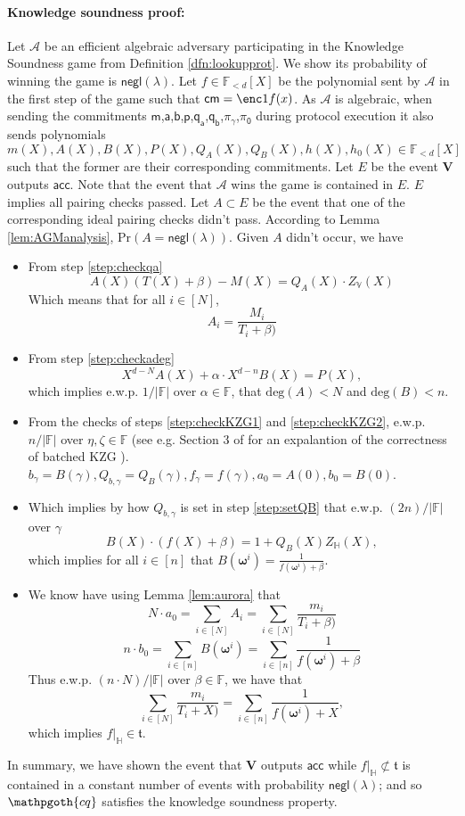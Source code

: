 \documentclass[11pt]{article} %
\newcommand{\cq}{\ensuremath{\mathpgoth{cq} }\xspace}
\newcommand{\F}{\ensuremath{\mathbb F}\xspace}
\newcommand{\adv}{\ensuremath{\mathcal A}\xspace}
\newcommand{\cm}{\ensuremath{\mathsf{cm}}\xspace}
\renewcommand{\deg}{\ensuremath{\mathrm{deg}}\xspace}
\newcommand{\negl}{\ensuremath{\mathsf{negl}(\lambda)}\xspace}
\newcommand{\acc}{\ensuremath{\mathsf{acc}}\xspace}
\newcommand{\ver}{\ensuremath{\mathsf{\mathbf{V}}}\xspace}
\newcommand{\hgen}{\ensuremath{\mathbf{\omega}}\xspace}
\newcommand{\polysofdeg}[1]{\ensuremath{\F_{< #1}[X]}\xspace}
\newcommand{\prob}{\ensuremath{\mathrm{Pr}}\xspace}
\newcommand{\restricttoset}[2]{\ensuremath{#1|_{#2}}\xspace}
\newcommand{\subspace}{\ensuremath{\mathbb{H}}\xspace}
\newcommand{\bigspace}{\ensuremath{\mathbb{V}}\xspace}
\newcommand{\witsize}{\ensuremath{n}\xspace}
\newcommand{\tabsize}{\ensuremath{N}\xspace}
\newcommand{\tab}{\ensuremath{\mathfrak{t}}\xspace}
\renewcommand{\a}{\ensuremath{\mathsf{a}}\xspace}
\renewcommand{\b}{\ensuremath{\mathsf{b}}\xspace}
\renewcommand{\p}{\ensuremath{\mathsf{p}}\xspace}
\newcommand{\qa}{\ensuremath{\mathsf{q_a}}\xspace}
\newcommand{\qb}{\ensuremath{\mathsf{q_b}}\xspace}
\newcommand{\m}{\ensuremath{\mathsf{m}}\xspace}
\newcommand{\gamproof}{\ensuremath{\mathsf{\pi_\gamma}}\xspace}
\newcommand{\zerproof}{\ensuremath{\mathsf{\pi_0}}\xspace}
\newcommand{\bgam}{\ensuremath{b_\gamma}\xspace}
\newcommand{\qbgam}{\ensuremath{Q_{b,\gamma}}\xspace}
\newcommand{\fgam}{\ensuremath{f_{\gamma}}\xspace}
\begin{document}
\paragraph{Knowledge soundness proof:}
Let \adv be an efficient algebraic adversary participating in the Knowledge Soundness game from
Definition \ref{dfn:lookupprot}.
We show its probability of winning the game is \negl.
Let $f\in \polysofdeg{d}$ be the polynomial sent by \adv in the first step of the game
such that $\cm=\enc1{f(x)}$.
As \adv is algebraic, when sending the commitments \m,\a,\b,\p,\qa,\qb,\gamproof,\zerproof during protocol execution it also sends polynomials $m(X),A(X),B(X),P(X),Q_A(X),Q_B(X),h(X),h_0(X)\in \polysofdeg{d}$ such that the former are their corresponding commitments.
Let $E$ be the event \ver outputs \acc.
Note that the event that \adv wins the game is contained in $E$. 
$E$ implies all pairing checks passed.
Let $A\subset E$ be the event that one of the corresponding ideal pairing checks didn't pass.
According to Lemma \ref{lem:AGManalysis}, $\prob(A=\negl)$.
Given $A$ didn't occur, we have
\begin{itemize}
 \item From step \ref{step:checkqa} \[A(X)(T(X)+\beta)-M(X) = Q_A(X)\cdot Z_\bigspace(X)\]
Which means that for all $i\in [\tabsize]$,
\[A_i=\frac{M_i}{T_i+\beta)}\]

\item From step  \ref{step:checkadeg}
\[X^{d-\tabsize}A(X)+\alpha\cdot X^{d-\witsize}B(X)=P(X),\]
which implies e.w.p. $1/|\F|$ over $\alpha\in \F$, that $\deg(A)<\tabsize$ and $\deg(B)<\witsize$.

\item From the checks of steps \ref{step:checkKZG1} and \ref{step:checkKZG2},  e.w.p. $\witsize/|\F|$ over $\eta,\zeta\in\F$ (see e.g. Section 3 of \cite{plonk} for an expalantion of the correctness of batched KZG \cite{kate}). 
$\bgam = B(\gamma),\qbgam =Q_B(\gamma),\fgam =f(\gamma),a_0=A(0),b_0=B(0)$.

\item Which implies by how \qbgam is set in step \ref{step:setQB}  that e.w.p. $(2\witsize)/|\F|$ over $\gamma$ 
\[B(X)\cdot (f(X)+\beta)=1+ Q_B(X)Z_\subspace(X),\]
which implies for all $i\in [\witsize]$ that
$B(\hgen^i)=\frac{1}{f(\hgen^i)+\beta}$.
\item We know have using Lemma \ref{lem:aurora} that
\[\tabsize\cdot a_0 = \sum_{i\in [\tabsize]} A_i = \sum_{i\in [\tabsize]}\frac{m_i}{T_i+\beta)}\]
\[\witsize\cdot b_0 = \sum_{i\in [\witsize]} B(\hgen^i) = \sum_{i\in [\witsize]}\frac{1}{f(\hgen^i)+\beta}\]
Thus e.w.p. $(\witsize\cdot \tabsize)/|\F|$ over $\beta\in \F$, we have that
\[\sum_{i\in [\tabsize]}\frac{m_i}{T_i+X)}=\sum_{i\in [\witsize]}\frac{1}{f(\hgen^i)+X},\]
which implies $\restricttoset{f}{\subspace}\in \tab$.
\end{itemize}
In summary, we have shown the event that \ver outputs \acc while $\restricttoset{f}{\subspace}\not\subset \tab$
is contained in a constant number of events with probability \negl; and so \cq satisfies the knowledge soundness property.
\end{document}
